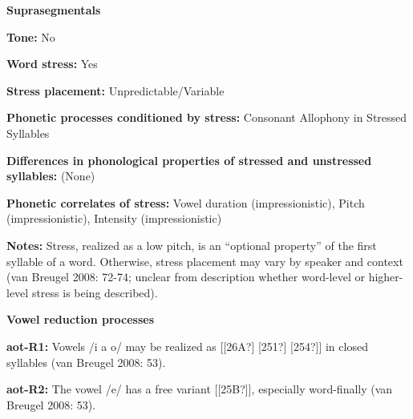 \begin{styleBody}
\textbf{Suprasegmentals}
\end{styleBody}

\begin{styleBody}
\textbf{Tone:} No
\end{styleBody}

\begin{styleBody}
\textbf{Word stress: }Yes
\end{styleBody}

\begin{styleBody}
\textbf{Stress placement:} Unpredictable/Variable
\end{styleBody}

\begin{styleBody}
\textbf{Phonetic processes conditioned by stress:} Consonant Allophony in Stressed Syllables
\end{styleBody}

\begin{styleBody}
\textbf{Differences in phonological properties of stressed and unstressed syllables:} (None)
\end{styleBody}

\begin{styleBody}
\textbf{Phonetic correlates of stress: }Vowel duration (impressionistic), Pitch (impressionistic), Intensity (impressionistic)
\end{styleBody}

\begin{styleBody}
\textbf{Notes:} Stress, realized as a low pitch, is an “optional property” of the first syllable of a word. Otherwise, stress placement may vary by speaker and context (van Breugel 2008: 72-74; unclear from description whether word-level or higher-level stress is being described).
\end{styleBody}

\begin{styleBody}
\textbf{Vowel reduction processes}
\end{styleBody}

\begin{styleBody}
\textbf{aot-R1: }Vowels /i a o/ may be realized as [[26A?] [251?] [254?]] in closed syllables (van Breugel 2008: 53).
\end{styleBody}

\begin{styleBody}
\textbf{aot-R2: }The vowel /e/ has a free variant [[25B?]], especially word-finally (van Breugel 2008: 53).
\end{styleBody}

